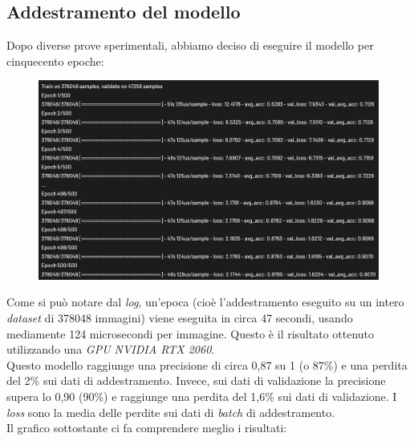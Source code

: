 \subsection{Addestramento del modello}
Dopo diverse prove sperimentali, abbiamo deciso di eseguire il modello per cinquecento epoche:
\begin{figure}[H]
	\centering
	\includegraphics[scale=0.8]{./images/storia.png}
\end{figure}
\noindent Come si può notare dal \textit{log}, un’epoca (cioè l’addestramento eseguito su un intero \textit{dataset} di 378048 immagini) viene eseguita in circa 47 secondi, usando mediamente 124 microsecondi per immagine. Questo è il risultato ottenuto utilizzando una \textit{GPU NVIDIA RTX 2060}.\\
\newline
Questo modello raggiunge una precisione di circa 0,87 su 1 (o 87\%) e una perdita del 2\% sui dati di addestramento. Invece, sui dati di validazione la precisione supera lo 0,90 (90\%) e raggiunge una perdita del 1,6\% sui dati di validazione. I \textit{loss} sono la media delle perdite sui dati di \textit{batch} di addestramento.\\
\newline
Il grafico sottostante ci fa comprendere meglio i risultati:
